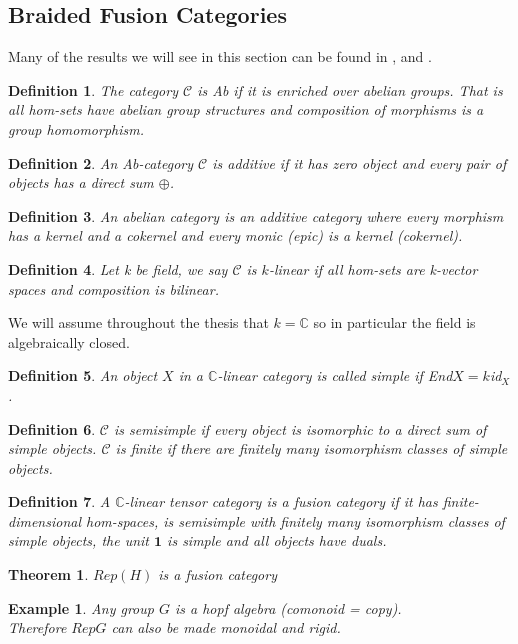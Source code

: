 \documentclass{article}
\newtheorem{definition}{Definition}
\newtheorem{example}{Example}
\newtheorem{theorem}{Theorem}
\begin{document}
\subsection{Braided Fusion Categories}
Many of the results we will see in this section can be found in \cite{Mueger08}, \cite{Bartlett15} and \cite{Freyd66}.
\begin{definition}
The category $\mathcal{C}$ is Ab if it is enriched over abelian groups. That is all hom-sets have abelian group structures and composition of morphisms is a group homomorphism. 
\end{definition}
\begin{definition}
An Ab-category $\mathcal{C}$ is additive if it has zero object and every pair of objects has a direct sum $\oplus$.
\end{definition}
\begin{definition}
An abelian category is an additive category where every morphism has a kernel and a cokernel and every monic (epic) is a kernel (cokernel).
\end{definition}
\begin{definition}
Let k be field, we say $\mathcal{C}$ is $k$-linear if all hom-sets are k-vector spaces and composition is bilinear.
\end{definition}
We will assume throughout the thesis that $k=\mathbb{C}$ so in particular the field is algebraically closed. 
\begin{definition}
An object $X$ in a $\mathbb{C}$-linear category is called simple if End$X=k$id$_X$.
\end{definition}
\begin{definition}
$\mathcal{C}$ is semisimple if every object is isomorphic to a direct sum of simple objects. $\mathcal{C}$ is finite if there are finitely many isomorphism classes of simple objects.
\end{definition}
\begin{definition}
A $\mathbb{C}$-linear tensor category is a fusion category if it has finite-dimensional hom-spaces, is semisimple with finitely many isomorphism classes of simple objects, the unit $\mathbf{1}$ is simple  and all objects have duals.
\end{definition}

\begin{theorem}
$Rep(H)$ is a fusion category
\end{theorem}

\begin{example}
Any group $G$ is a hopf algebra (comonoid = copy).\\
Therefore $RepG$ can also be made monoidal and rigid.
\end{example}
\end{document}
